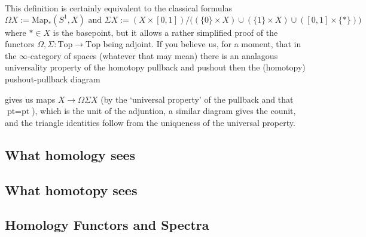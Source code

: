 This definition is certainly equivalent to the classical formulas
	\[
	\Omega X := \text{Map}_\ast(S^1,X)
	\text{ and }
	\Sigma X := (X \times [0,1]) / \big( (\{0\}\times X) \cup (\{1\}\times X) \cup ([0,1]\times\{\ast\}) \big)
	\]
where $\ast\in X$ is the basepoint, but it allows a rather simplified proof of the functors $\Omega, \Sigma : \text{Top} \to \text{Top}$ being adjoint. If you believe us, for a moment, that in the $\infty$-category of spaces (whatever that may mean) there is an analagous universality property of the homotopy pullback and pushout then the (homotopy) pushout-pullback diagram 
	\begin{center}
	\end{center}
gives us maps $X \to \Omega\Sigma X$ (by the `universal property' of the pullback and that $\text{pt} = \text{pt}$), which is the unit of the adjuntion, a similar diagram gives the counit, and the triangle identities follow from the uniqueness of the universal property. 




























\newpage
\subsection{What homology sees}
\subsection{What homotopy sees}
\subsection{Homology Functors and Spectra}
